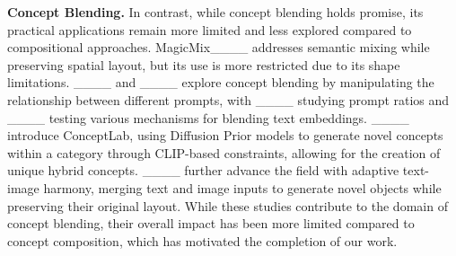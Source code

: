 \textbf{Concept Blending. }In contrast, while concept blending holds promise, its practical applications remain more limited and less explored compared to compositional approaches. MagicMix____ addresses semantic mixing while preserving spatial layout, but its use is more restricted due to its shape limitations. ____ and ____ explore concept blending by manipulating the relationship between different prompts, with ____ studying prompt ratios and ____ testing various mechanisms for blending text embeddings. ____ introduce ConceptLab, using Diffusion Prior models to generate novel concepts within a category through CLIP-based constraints, allowing for the creation of unique hybrid concepts. ____ further advance the field with adaptive text-image harmony, merging text and image inputs to generate novel objects while preserving their original layout. While these studies contribute to the domain of concept blending, their overall impact has been more limited compared to concept composition, which has motivated the completion of our work.